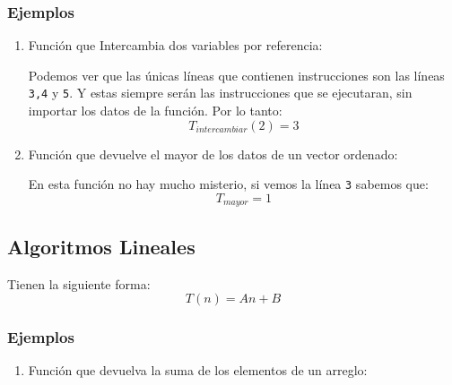 \subsubsection{Ejemplos}
\begin{enumerate}
\item Función que Intercambia dos variables por referencia:

Podemos ver que las únicas líneas que contienen instrucciones son las líneas \texttt{3,4} y \texttt{5}. Y estas siempre serán las instrucciones que se ejecutaran, sin importar los datos de la función. Por lo tanto:
$$T_{intercambiar}(2)=3$$
\item Función que devuelve el mayor de los datos de un vector ordenado:

En esta función no hay mucho misterio, si vemos la línea \texttt{3} sabemos que:
$$T_{mayor}=1$$
\end{enumerate}
\subsection{Algoritmos Lineales}
Tienen la siguiente forma:
$$T(n)=An+B$$
\subsubsection{Ejemplos}
\begin{enumerate}
\item Función que devuelva la suma de los elementos de un arreglo:

\end{enumerate}
